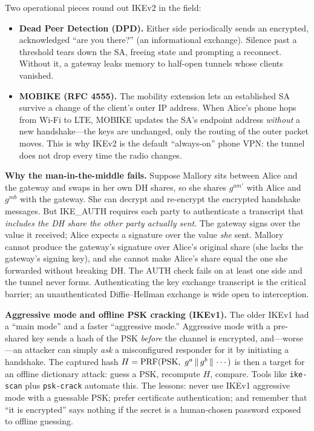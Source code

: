 Two operational pieces round out IKEv2 in the field:

\begin{itemize}
\item \textbf{Dead Peer Detection (DPD).} Either side periodically sends an encrypted, acknowledged ``are you there?'' (an informational exchange). Silence past a threshold tears down the SA, freeing state and prompting a reconnect. Without it, a gateway leaks memory to half-open tunnels whose clients vanished.
\item \textbf{MOBIKE (RFC 4555).} The mobility extension lets an established SA survive a change of the client's outer IP address. When Alice's phone hops from Wi-Fi to LTE, MOBIKE updates the SA's endpoint address \emph{without} a new handshake---the keys are unchanged, only the routing of the outer packet moves. This is why IKEv2 is the default ``always-on'' phone VPN: the tunnel does not drop every time the radio changes.
\end{itemize}

\begin{whybox}
\textbf{Why the man-in-the-middle fails.} Suppose Mallory sits between Alice and the gateway and swaps in her own DH shares, so she shares \(g^{a m'}\) with Alice and \(g^{m b}\) with the gateway. She can decrypt and re-encrypt the encrypted handshake messages. But IKE\_AUTH requires each party to authenticate a transcript that \emph{includes the DH share the other party actually sent}. The gateway signs over the value it received; Alice expects a signature over the value \emph{she} sent. Mallory cannot produce the gateway's signature over Alice's original share (she lacks the gateway's signing key), and she cannot make Alice's share equal the one she forwarded without breaking DH. The AUTH check fails on at least one side and the tunnel never forms. Authenticating the key exchange transcript is the critical barrier; an unauthenticated Diffie--Hellman exchange is wide open to interception.
\end{whybox}

\begin{attackbox}
\textbf{Aggressive mode and offline PSK cracking (IKEv1).} The older IKEv1 had a ``main mode'' and a faster ``aggressive mode.'' Aggressive mode with a pre-shared key sends a hash of the PSK \emph{before} the channel is encrypted, and---worse---an attacker can simply \emph{ask} a misconfigured responder for it by initiating a handshake. The captured hash \(H = \mathrm{PRF}(\text{PSK},\ g^{a}\,\|\, g^{b}\,\|\, \cdots)\) is then a target for an offline dictionary attack: guess a PSK, recompute \(H\), compare. Tools like \texttt{ike-scan} plus \texttt{psk-crack} automate this. The lessons: never use IKEv1 aggressive mode with a guessable PSK; prefer certificate authentication; and remember that ``it is encrypted'' says nothing if the secret is a human-chosen password exposed to offline guessing.
\end{attackbox}

